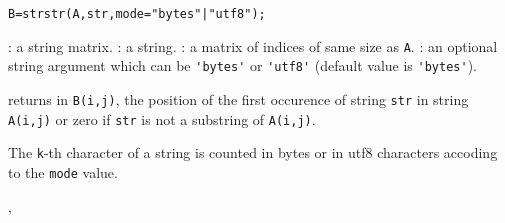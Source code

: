 
\begin{mandesc}
\end{mandesc}
\begin{calling_sequence}
\begin{verbatim}
B=strstr(A,str,mode="bytes"|"utf8");
\end{verbatim}
\end{calling_sequence}

\begin{parameters}
  \begin{varlist}
    : a string matrix.
    : a string.
    : a matrix of indices of same size as \verb+A+.
    : an optional string argument which can be \verb!'bytes'! or \verb!'utf8'!
    (default value is \verb!'bytes'!).
  \end{varlist}
\end{parameters}

\begin{mandescription}
  returns in \verb+B(i,j)+, the position of the first occurence
  of string \verb+str+ in string \verb+A(i,j)+ or zero if \verb+str+
  is not a substring of \verb+A(i,j)+.

  The \verb!k!-th character of a string is counted in bytes or in utf8 characters accoding
  to the \verb!mode! value.
\end{mandescription}

\begin{manseealso}
  , 
\end{manseealso}

\begin{manseealso}
\end{manseealso}
